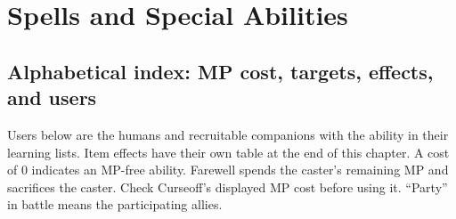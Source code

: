 \chapter{Spells and Special Abilities}
\label{written-abilities}

\section{Alphabetical index: MP cost, targets, effects, and users}
Users below are the humans and recruitable companions with the ability in
their learning lists. Item effects have their own table at the end of this
chapter. A cost of 0 indicates an MP-free ability. Farewell spends the caster's
remaining MP and sacrifices the caster. Check Curseoff's displayed MP cost
before using it. ``Party'' in battle means the participating allies.


